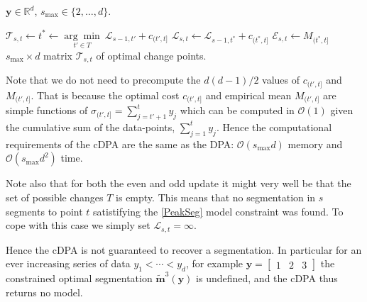 \documentclass{article}
\newcommand{\RR}{\mathbb R}
\begin{document}
\begin{algorithm}[H]
\begin{algorithmic}[1]
\REQUIRE $\mathbf y\in\RR^d$, $s_{\text{max}}\in\{2, \dots, d\}$.
\CASE{even}{$T \gets \{ t' < t \mid \mathcal{E}_{s-1,t'} < M_{(t', t]} \}$}
\ENDCASE
\CASE{ odd}{$T \gets \{ t' < t \mid \mathcal{E}_{s-1,t'} > M_{(t', t]} \}$}
\ENDCASE
\ENDSWITCH

\ENDCASE
\DEFAULT{}
\STATE $ \mathcal T_{s, t}\gets t^* \gets
\underset{ t'\in T}{\arg \min}\  {\mathcal{L}}_{s-1,t'} + c_{(t',t]}$
\STATE $ {\mathcal{L}}_{s,t} \gets 
{\mathcal{L}}_{s-1,t^*} + c_{(t^*,t]} $
\STATE $\mathcal{E}_{s,t} \gets M_{(t^*, t]}$
\ENDDEFAULT
\ENDSWITCH
\ENDFORFOR
\RETURN $s_{\text{max}}\times d$ matrix $\mathcal T_{s, t}$ of optimal change points.
\caption{Constrained dynamic programming (cDPA) 
}
\end{algorithmic}\label{algo:v2}
\end{algorithm}

Note that we do not need to precompute the $d(d-1)/2$ values of
$c_{(t',t]}$ and $M_{(t', t]}$. That is because the optimal cost
$c_{(t',t]}$ and empirical mean $M_{(t', t]}$ are simple functions of
$\sigma_{(t', t]} =\sum_{j=t'+1}^t y_j$ which can be computed in
$\mathcal{O}(1)$ given the cumulative sum of the data-points,
$\sum_{j=1}^t y_j$. Hence the computational requirements of the cDPA
are the same as the DPA: $\mathcal{O}(s_{\text{max}} d)$ memory and
$\mathcal O(s_{\text{max}} d^2)$ time.

Note also that for both the even and odd update it might very well be
that the set of possible changes $T$ is empty.  This means that no
segmentation in $s$ segments to point $t$ satistifying the
\ref{PeakSeg} model constraint was found.  To cope with this case we
simply set ${\mathcal L}_{s, t} = \infty$.

Hence the cDPA is not guaranteed to recover a segmentation. In
particular for an ever increasing series of data $y_1 < \cdots < y_d$,
for example $\mathbf y = \left[ \begin{array}{ccc} 1 & 2 &
    3 \end{array}\right]$ the constrained optimal segmentation
$\mathbf{\tilde m}^3(\mathbf y)$ is undefined, and the cDPA thus
returns no model.
\end{document}
